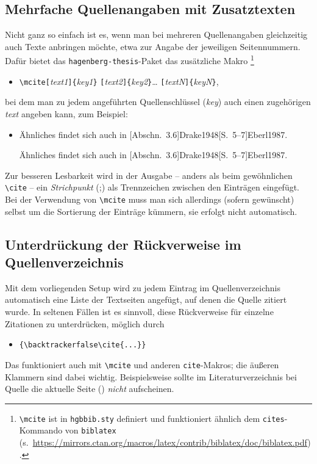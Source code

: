 \subsection{Mehrfache Quellenangaben mit Zusatztexten}

Nicht ganz so einfach ist es, wenn man bei mehreren Quellenangaben
gleichzeitig auch Texte anbringen möchte, etwa zur Angabe der jeweiligen
Seitennummern. Dafür bietet das \texttt{hagenberg-thesis}-Paket das
zusätzliche Makro%
\footnote{\texttt{\textbackslash mcite} ist in \texttt{hgbbib.sty} definiert und
funktioniert ähnlich dem \texttt{{\bs}cites}-Kommando von \texttt{biblatex}
(s.\ \url{https://mirrors.ctan.org/macros/latex/contrib/biblatex/doc/biblatex.pdf}).}
%
\begin{itemize}
\item[]
\verb!\mcite[!\textit{text1}\verb!]{!\textit{key1}\verb!}!%
      \verb![!\textit{text2}\verb!]{!\textit{key2}\verb!}!\ldots%
			\verb![!\textit{textN}\verb!]{!\textit{keyN}\verb!}!,
\end{itemize}
%
bei dem man zu jedem angeführten Quellenschlüssel (\textit{key}) auch einen
zugehörigen \textit{text} angeben kann, zum Beispiel:
%
\begin{itemize}
    \item Ähnliches findet sich auch in
    [Abschn.~3.6]{Drake1948}[S.~5--7]{Eberl1987}.
\begin{LaTeXCode}[numbers=none]
Ähnliches findet sich auch in [Abschn.~3.6]{Drake1948}[S.~5--7]{Eberl1987}.
\end{LaTeXCode}
\end{itemize}
%
Zur besseren Lesbarkeit wird in der Ausgabe -- anders als beim gewöhnlichen
\texttt{\textbackslash cite} -- ein \emph{Strichpunkt} (;) als Trennzeichen
zwischen den Einträgen eingefügt. Bei der Verwendung von
\texttt{\textbackslash mcite} muss man sich allerdings (sofern gewünscht)
selbst um die Sortierung der Einträge kümmern, sie erfolgt nicht automatisch.


\subsection{Unterdrückung der Rückverweise im Quellenverzeichnis}

Mit dem vorliegenden Setup wird zu jedem Eintrag im Quellenverzeichnis
automatisch eine Liste der Textseiten angefügt, auf denen die Quelle zitiert
wurde. In seltenen Fällen ist es sinnvoll, diese Rückverweise für einzelne 
Zitationen zu unterdrücken, möglich durch
%
\begin{itemize}
    \item[] \verb!{\backtrackerfalse\cite{...}}!
\end{itemize}
%
Das funktioniert auch mit \verb!\mcite! und anderen \verb!cite!-Makros;
die äußeren Klammern sind dabei wichtig. Beispielsweise sollte im
Literaturverzeichnis bei Quelle {\backtrackerfalse\parencite{Bezos2026}} 
die aktuelle Seite (\the\value{page}) \emph{nicht} aufscheinen.


